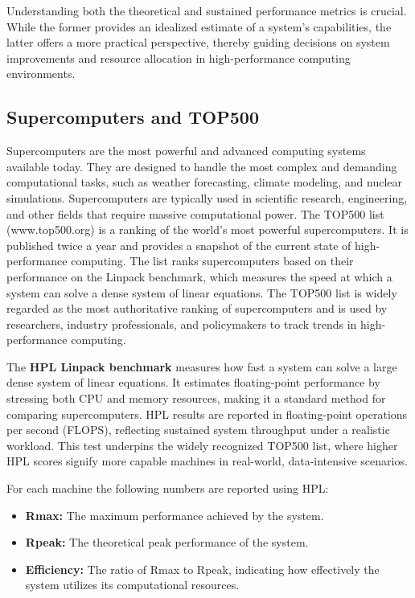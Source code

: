 Understanding both the theoretical and sustained performance metrics is crucial. While the former provides an idealized estimate of a system's capabilities, the latter offers a more practical perspective, thereby guiding decisions on system improvements and resource allocation in high-performance computing environments.


\subsection{Supercomputers and TOP500} \label{sec:supercomputers}

Supercomputers are the most powerful and advanced computing systems available today. They are designed to handle the most complex and demanding computational tasks, such as weather forecasting, climate modeling, and nuclear simulations. Supercomputers are typically used in scientific research, engineering, and other fields that require massive computational power.
The TOP500 list (www.top500.org) is a ranking of the world's most powerful supercomputers. It is published twice a year and provides a snapshot of the current state of high-performance computing. The list ranks supercomputers based on their performance on the Linpack benchmark, which measures the speed at which a system can solve a dense system of linear equations. The TOP500 list is widely regarded as the most authoritative ranking of supercomputers and is used by researchers, industry professionals, and policymakers to track trends in high-performance computing.

The \textbf{HPL Linpack benchmark} measures how fast a system can solve a large dense system of linear equations. It estimates floating-point performance by stressing both CPU and memory resources, making it a standard method for comparing supercomputers. HPL results are reported in floating-point operations per second (FLOPS), reflecting sustained system throughput under a realistic workload. This test underpins the widely recognized TOP500 list, where higher HPL scores signify more capable machines in real-world, data-intensive scenarios.

For each machine the following numbers are reported using HPL:
\begin{itemize}
    \item \textbf{Rmax:} The maximum performance achieved by the system.
    \item \textbf{Rpeak:} The theoretical peak performance of the system.
    \item \textbf{Efficiency:} The ratio of Rmax to Rpeak, indicating how effectively the system utilizes its computational resources.
\end{itemize}


